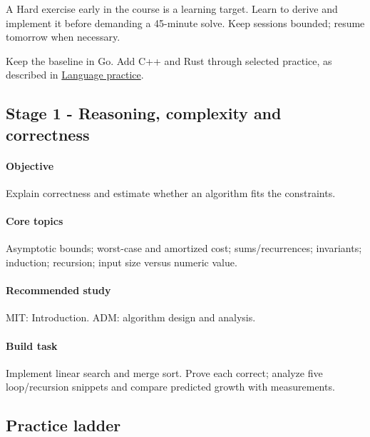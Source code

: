 \documentclass[11pt,letterpaper]{article}
\begin{document}
A Hard exercise early in the course is a learning target. Learn to derive and implement it before demanding a 45-minute solve. Keep sessions bounded; resume tomorrow when necessary.

Keep the baseline in Go. Add C++ and Rust through selected practice, as described in \hyperref[sec:24]{Language practice}.

\par{}
\begin{samepage}
\section{Stage 1 - Reasoning, complexity and correctness}\label{sec:5}

\label{stage:1}


\paragraph*{Objective}

Explain correctness and estimate whether an algorithm fits the constraints.

\end{samepage}

\paragraph*{Core topics}

Asymptotic bounds; worst-case and amortized cost; sums/recurrences; invariants; induction; recursion; input size versus numeric value.

\paragraph*{Recommended study}

MIT: Introduction. ADM: algorithm design and analysis.

\paragraph*{Build task}

Implement linear search and merge sort. Prove each correct; analyze five loop/recursion snippets and compare predicted growth with measurements.

\subsection*{Practice ladder}
\end{document}
